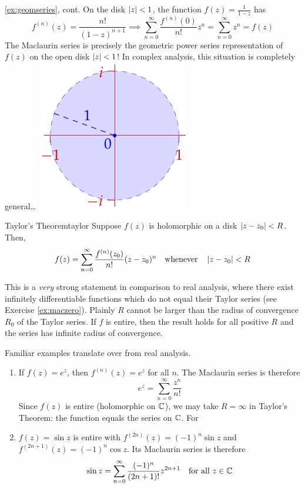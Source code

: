 \begin{example*}[exstyle,lower separated=false, sidebyside, sidebyside align=top seam, sidebyside gap=0pt, righthand width=0.26\linewidth]{\ref{ex:geomseries}, cont.}{}
	On the disk $\left| z\right|<1$, the function $f(z)=\frac 1{1-z}$ has 
  \[
  	f^{(n)}(z)=\frac{n!}{(1-z)^{n+1}}\implies \sum\limits_{n=0}^\infty\frac{f^{(n)}(0)}{n!}z^n =\sum\limits_{n=0}^\infty z^n = f(z)
  \]
  The Maclaurin series is precisely the geometric power series representation of $f(z)$ on the open disk $\left| z\right|<1$!\smallbreak
  In complex analysis, this situation is completely general\ldots
	\tcblower
  \flushright\includegraphics[scale=0.9]{taylorex1}
\end{example*}


\begin{thm}{Taylor's Theorem}{taylor}
	Suppose $f(z)$ is holomorphic on a disk $\left| z-z_0\right|<R$. Then,
	\[
		f(z)=\sum_{n=0}^\infty \frac{f^{(n)}(z_0)}{n!}(z-z_0)^n
		\quad\text{whenever}\quad
		\left| z-z_0\right|<R
	\]
\end{thm}

This is a \emph{very} strong statement in comparison to real analysis, where there exist infinitely differentiable functions which do not equal their Taylor series (see Exercise \ref{ex:maczero}).\smallbreak
Plainly $R$ cannot be larger than the radius of convergence $R_0$ of the Taylor series. If $f$ is entire, then the result holds for all positive $R$ and the series has infinite radius of convergence.

\begin{examples}{}{}
	Familiar examples translate over from real analysis.
	\begin{enumerate}
	  \item If $f(z)=e^z$, then $f^{(n)}(z)=e^z$ for all $n$. The Maclaurin series is therefore
  	\[
  		e^z=\sum\limits_{n=0}^\infty\frac{z^n}{n!}
  	\]
  	Since $f(z)$ is entire (holomorphic on $\mathbb{C}$), we may take $R=\infty$ in Taylor's Theorem: the function equals the series on $\mathbb{C}$. For 
  
  \item $f(z)=\sin z$ is entire with $f^{(2n)}(z)=(-1)^n\sin z$ and $f^{(2n+1)}(z)=(-1)^n\cos z$. Its Maclaurin series is therefore
  \[\sin z=\sum\limits_{n=0}^\infty\frac{(-1)^n}{(2n+1)!}z^{2n+1}\quad\text{for all }z\in\mathbb{C}\]
  \goodbreak
  \end{enumerate}
\end{examples}

